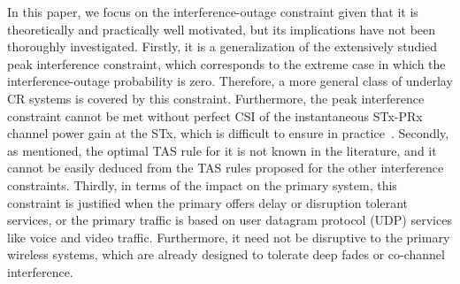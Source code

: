\documentclass[12pt,draftcls,peerreview,onecolumn]{IEEEtran}
\begin{document}
In this paper, we focus on the interference-outage constraint given that it is theoretically and practically well motivated, but its implications have not been thoroughly investigated. Firstly, it is a generalization of the extensively studied peak interference constraint, which corresponds to the extreme case in which the interference-outage probability is zero. Therefore, a more general class of underlay CR systems is covered by this constraint. Furthermore, the peak interference constraint cannot be met without perfect  CSI of the instantaneous STx-PRx channel power gain at the STx, which is difficult to ensure in practice~\cite{musavian_2009_tcom,Suraweera_2010_TVT,Peng_2016_eurasip}. Secondly, as mentioned, the optimal TAS rule for it is not known in the literature, and it cannot be easily deduced from the TAS rules proposed for the other interference constraints. Thirdly, in terms of the impact on the primary system, this constraint is justified when the primary offers delay or disruption tolerant services, or the primary traffic is based on user datagram protocol (UDP) services like voice and video traffic. Furthermore, it need not be disruptive to the primary wireless systems, which are already designed to tolerate deep fades or co-channel interference. 
\end{document}
